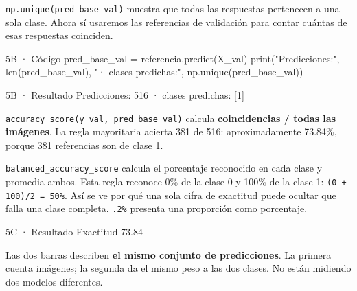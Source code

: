 \texttt{\small np.\allowbreak{}unique(\allowbreak{}pred\_\allowbreak{}base\_\allowbreak{}val)\allowbreak{}} muestra que todas las respuestas pertenecen a una sola clase. Ahora sí usaremos las referencias de validación para contar cuántas de esas respuestas coinciden.


\begin{Codigo}{5B · Código}
pred_base_val = referencia.predict(X_val)
print("Predicciones:", len(pred_base_val), "· clases predichas:", np.unique(pred_base_val))
\end{Codigo}

\begin{Salida}{5B · Resultado}
Predicciones: 516 · clases predichas: [1]
\end{Salida}

\label{paso-5c}

\texttt{\small accuracy\_\allowbreak{}score(\allowbreak{}y\_\allowbreak{}val,\allowbreak{} pred\_\allowbreak{}base\_\allowbreak{}val)\allowbreak{}} calcula \textbf{coincidencias / todas las imágenes}. La regla mayoritaria acierta 381 de 516: aproximadamente 73.84\%, porque 381 referencias son de clase 1.

\texttt{\small balanced\_\allowbreak{}accuracy\_\allowbreak{}score} calcula el porcentaje reconocido en cada clase y promedia ambos. Esta regla reconoce 0\% de la clase 0 y 100\% de la clase 1: \texttt{\small (\allowbreak{}0 + 100)\allowbreak{}/\allowbreak{}2 =\allowbreak{} 50\%}. Así se ve por qué una sola cifra de exactitud puede ocultar que falla una clase completa. \texttt{\small .\allowbreak{}2\%} presenta una proporción como porcentaje.



\begin{Salida}{5C · Resultado}
Exactitud 73.84%
\end{Salida}

\label{paso-5d}

Las dos barras describen \textbf{el mismo conjunto de predicciones}. La primera cuenta imágenes; la segunda da el mismo peso a las dos clases. No están midiendo dos modelos diferentes.

